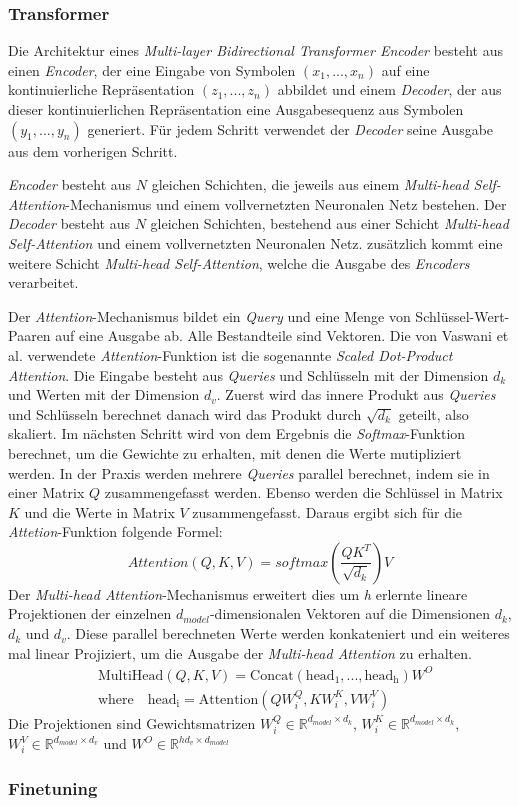 \subsubsection{Transformer}
Die Architektur eines \textit{Multi-layer Bidirectional Transformer Encoder} besteht aus einen \textit{Encoder}, der eine Eingabe von Symbolen $(x_1,...,x_n)$ auf eine kontinuierliche Repräsentation $(z_1,...,z_n)$ abbildet 
und einem \textit{Decoder}, der aus dieser kontinuierlichen Repräsentation eine Ausgabesequenz aus Symbolen $(y_1,...,y_n)$ generiert. Für jedem Schritt verwendet der 
\textit{Decoder} seine Ausgabe aus dem vorherigen Schritt. \par
\textit{Encoder} besteht aus $N$ gleichen Schichten, die jeweils aus einem \textit{Multi-head Self-Attention}-Mechanismus und einem vollvernetzten Neuronalen Netz bestehen.
Der \textit{Decoder} besteht aus $N$ gleichen Schichten, bestehend aus einer Schicht \textit{Multi-head Self-Attention} und einem vollvernetzten Neuronalen Netz. zusätzlich kommt eine weitere Schicht \textit{Multi-head Self-Attention},
welche die Ausgabe des \textit{Encoders} verarbeitet. \par
Der \textit{Attention}-Mechanismus \cite{vaswani2017attention} bildet ein \textit{Query} und eine Menge von Schlüssel-Wert-Paaren auf eine Ausgabe ab. Alle Bestandteile sind Vektoren.
Die von Vaswani et al. verwendete \textit{Attention}-Funktion ist die sogenannte \textit{Scaled Dot-Product Attention}. Die Eingabe besteht aus \textit{Queries} und Schlüsseln mit der Dimension $d_k$ und Werten mit der Dimension $d_v$.
Zuerst wird das innere Produkt aus \textit{Queries} und Schlüsseln berechnet danach wird das Produkt durch $\sqrt{d_k}$ geteilt, also skaliert. Im nächsten Schritt wird von dem Ergebnis die \textit{Softmax}-Funktion berechnet, um die Gewichte zu erhalten, mit denen die Werte mutipliziert werden. 
In der Praxis werden mehrere \textit{Queries} parallel berechnet, indem sie in einer Matrix $Q$ zusammengefasst werden. Ebenso werden die Schlüssel in Matrix $K$ und die Werte in Matrix $V$ zusammengefasst.
Daraus ergibt sich für die \textit{Attetion}-Funktion folgende Formel:
\begin{equation*}
Attention(Q,K,V) = softmax(\frac{QK^T}{\sqrt{d_k}})V    
\end{equation*}
Der \textit{Multi-head Attention}-Mechanismus erweitert dies um \textit{h} erlernte lineare Projektionen der einzelnen $d_{model}$-dimensionalen Vektoren auf die Dimensionen $d_k$, $d_k$ und $d_v$. 
Diese parallel berechneten Werte werden konkateniert und ein weiteres mal linear Projiziert, um die Ausgabe der \textit{Multi-head Attention} zu erhalten.
\begin{align*}
   & \mathrm{MultiHead}(Q,K,V) = \mathrm{Concat}(\mathrm{head_1},...,\mathrm{head_h})W^O \\
   & \mathrm{where} \quad \mathrm{head_i} = \mathrm{Attention}(QW_i^Q,KW_i^K,VW_i^V)
\end{align*}
Die Projektionen sind Gewichtsmatrizen $W_i^Q \in \mathbb{R}^{d_{model}\times d_k}$, $W_i^K \in \mathbb{R}^{d_{model}\times d_k}$, $W_i^V \in \mathbb{R}^{d_{model}\times d_v}$ und $W^O \in \mathbb{R}^{hd_v\times d_{model}}$
\subsubsection{Finetuning}